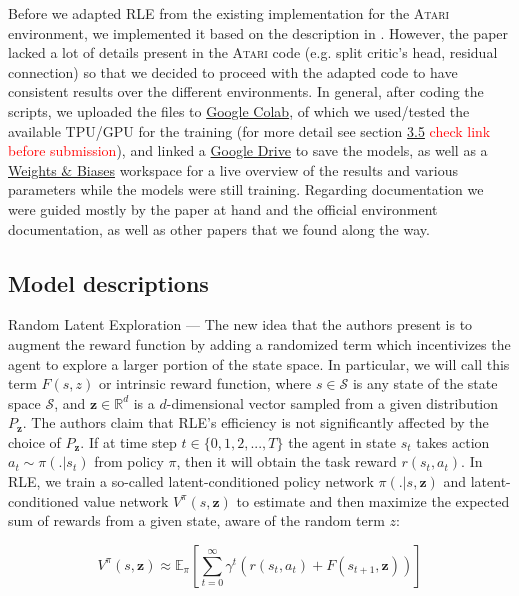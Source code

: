 \documentclass[10pt]{article} %
\begin{document}
\noindent Before we adapted RLE from the existing implementation for the \textsc{Atari} environment, we implemented it based on the description in \cite{rle-paper}. However, the paper lacked a lot of details present in the \textsc{Atari} code (e.g. split critic's head, residual connection) so that we decided to proceed with the adapted code to have consistent results over the different environments. In general, after coding the scripts, we uploaded the files to \href{https://colab.research.google.com/}{Google Colab}, of which we used/tested the available TPU/GPU for the training (for more detail see section \hyperlink{computational-requirements}{3.5} \textcolor{red}{check link before submission}), and linked a \href{https://drive.google.com}{Google Drive} to save the models, as well as a \href{https://wandb.ai}{Weights \& Biases} workspace for a live overview of the results and various parameters while the models were still training. Regarding documentation we were guided mostly by the paper at hand and the official environment documentation, as well as other papers that we found along the way.

\subsection{Model descriptions}

\noindent Random Latent Exploration --- The new idea that the authors \cite{rle-paper} present is to augment the reward function by adding a randomized term which incentivizes the agent to explore a larger portion of the state space. In particular, we will call this term $F(s, z)$ or intrinsic reward function, where $s \in \mathcal{S}$ is any state of the state space $\mathcal{S}$, and $\textbf{z} \in \mathbb{R}^{d}$ is a $d$-dimensional vector sampled from a given distribution $P_{\textbf{z}}$. The authors \cite{rle-paper} claim that RLE's efficiency is not significantly affected by the choice of $P_{\textbf{z}}$. If at time step $t \in \{0, 1, 2, ..., T\}$ the agent in state $s_{t}$ takes action $a_{t} \sim \pi(. | s_{t})$ from policy $\pi$, then it will obtain the task reward $r (s_{t}, a_{t})$. In RLE, we train a so-called latent-conditioned policy network $\pi(. | s, \textbf{z})$ and latent-conditioned value network $V^{\pi}(s, \textbf{z})$ to estimate and then maximize the expected sum of rewards from a given state, aware of the random term $z$:

\begin{equation}
    V^{\pi}(s, \textbf{z}) \approx \mathbb{E}_{\pi} \left[\sum_{t = 0}^{\infty} \gamma^{t} \left(r(s_{t}, a_{t}) + F(s_{t+1}, \textbf{z})\right) \right]
    \label{eq:value_func}
\end{equation}
\end{document}
